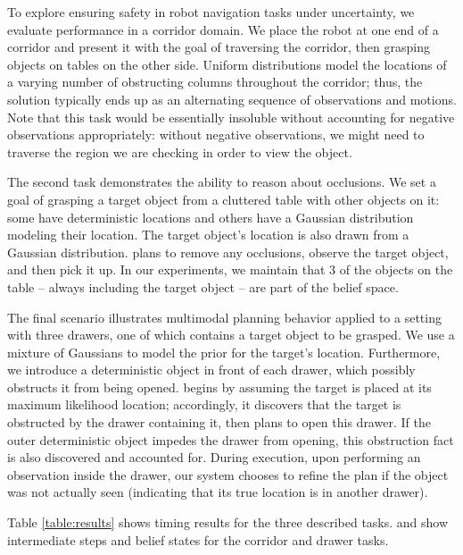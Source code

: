 To explore ensuring safety in robot navigation tasks under uncertainty, we
evaluate performance in a corridor domain. We place the robot at one end of a corridor
and present it with the goal of traversing the corridor, then grasping
objects on tables on the other side. Uniform distributions model the locations of
a varying number of obstructing columns throughout the corridor; thus, the solution
typically ends up as an alternating sequence of observations and motions. Note that this task would be essentially
insoluble without accounting for negative observations appropriately: without negative
observations, we might need to traverse the region we are checking in
order to view the object.

The second task demonstrates the ability to reason about occlusions. We
set a goal of grasping a target object from a cluttered table with other
objects on it: some have deterministic locations and others have a Gaussian distribution
modeling their location. The target object's location is also drawn from a Gaussian
distribution. \ibsp{} plans to remove any occlusions, observe the target object, and
then pick it up. In our experiments, we maintain that 3 of the objects on the table -- always including
the target object -- are part of the belief space.

The final scenario illustrates multimodal planning behavior applied to a setting
with three drawers, one of which contains a target object to be grasped. We use a
mixture of Gaussians to model the prior for the target's location.
Furthermore, we introduce a deterministic object in front of each drawer, which possibly
obstructs it from being opened. \ibsp{} begins by assuming the target is placed at its maximum likelihood
location; accordingly, it discovers that the target is obstructed by the drawer containing it, then
plans to open this drawer. If the outer deterministic object impedes the drawer from opening, this
obstruction fact is also discovered and accounted for. During execution, upon performing an observation inside the drawer, our system
chooses to refine the plan if the object was not actually seen (indicating that its true location is in another drawer).

Table \ref{table:results} shows timing results for the three described
tasks.  and  show intermediate steps and belief
states for the corridor and drawer tasks.

